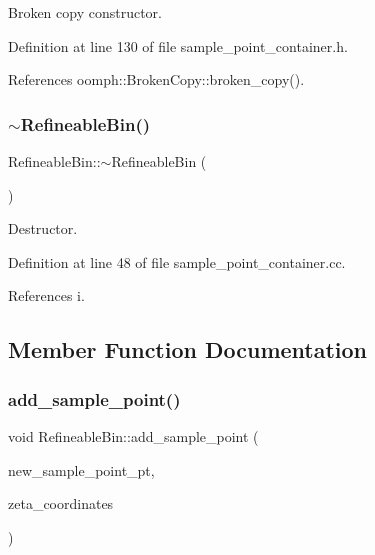 Broken copy constructor. 



Definition at line 130 of file sample\+\_\+point\+\_\+container.\+h.



References oomph\+::\+Broken\+Copy\+::broken\+\_\+copy().

\mbox{\label{classRefineableBin_a844cf253cd0a1c9a348bc93e0d96fda4}} 
\subsubsection{\texorpdfstring{$\sim$\+Refineable\+Bin()}{~RefineableBin()}}
{\footnotesize\ttfamily Refineable\+Bin\+::$\sim$\+Refineable\+Bin (\begin{DoxyParamCaption}{ }\end{DoxyParamCaption})}



Destructor. 



Definition at line 48 of file sample\+\_\+point\+\_\+container.\+cc.



References i.



\subsection{Member Function Documentation}
\mbox{\label{classRefineableBin_a55737725c556d80d6695549550b52df5}} 
\subsubsection{\texorpdfstring{add\+\_\+sample\+\_\+point()}{add\_sample\_point()}}
{\footnotesize\ttfamily void Refineable\+Bin\+::add\+\_\+sample\+\_\+point (\begin{DoxyParamCaption}\item[{\hyperlink{classSamplePoint}{Sample\+Point} $\ast$}]{new\+\_\+sample\+\_\+point\+\_\+pt,  }\item[{const Vector$<$ double $>$ \&}]{zeta\+\_\+coordinates }\end{DoxyParamCaption})}




